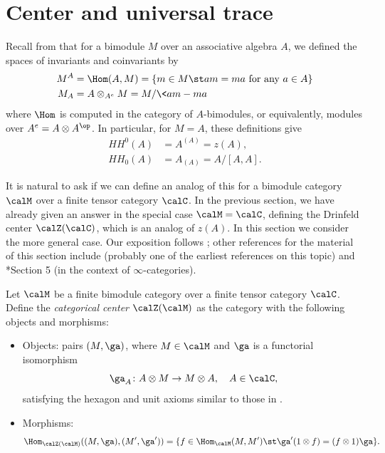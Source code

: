 \section{Center and universal trace}\label{s:cat-trace}
Recall from  that for a bimodule $M$ over an associative
algebra $A$, we defined the spaces of invariants and coinvariants by
\begin{equation}
  \begin{aligned}
    M^{A}&=\Hom(A,M)=\{m\in M\st am=ma \text{ for any } a\in A\}\\
    M_{A}&=A\otimes_{A^e} M = M/\<am-ma\>
  \end{aligned}
\end{equation}
where $\Hom$ is computed in the category of $A$-bimodules, or equivalently,
modules over $A^e=A\otimes A^\op$. In particular, for $M=A$, these definitions
give
\begin{align*}
  HH^0(A)&=A^{(A)}=z(A),\\
  HH_0(A)&=A_{(A)}= A/[A,A].
\end{align*}

It is natural to ask if we can define an analog of this for a bimodule category
$\calM$ over a finite tensor category $\calC$. In the previous section, we have
already given an answer in the special case $\calM=\calC$, defining the Drinfeld
center $\calZ(\calC)$, which is an analog of $z(A)$. In this section we
consider the more general case. Our exposition follows
; other references for the material of
this section include  (probably one of the earliest references
on this topic) and *{Section 5} (in the context
of $\infty$-categories).

\begin{definition}\label{d:cat-center}
  Let $\calM$ be a finite bimodule category over a finite tensor category
  $\calC$. Define the \emph{categorical center}
  $\calZ(\calM)$ as the category
  with the following objects and morphisms:
    \begin{itemize}
      \item Objects: pairs $(M, \ga)$, where $M\in \calM$ and $\ga$ is a
      functorial isomorphism
      $$
        \ga_A\colon A\otimes M\to M\otimes A, \quad A\in \calC,
      $$
      satisfying the hexagon and unit axioms similar to those in
      .
      \item Morphisms:
      $$
      \Hom_{\calZ(\calM)}((M, \ga), (M', \ga'))
        =\{f \in \Hom_\calM(M,M')\st \ga' (1 \otimes f) =(f\otimes 1) \ga\}.
      $$
    \end{itemize}
  \end{definition}

